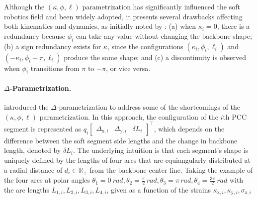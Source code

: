 Although the $(\kappa,\phi,\ell)$ parametrization has significantly influenced the soft robotics field and been widely adopted, it presents several drawbacks affecting both kinematics and dynamics, as initially noted by \citet{della2020improved}: (a) when $\kappa_i = 0$, there is a redundancy because $\phi_i$ can take any value without changing the backbone shape; (b) a sign redundancy exists for $\kappa$, since the configurations $(\kappa_i, \phi_i, \ell_i)$ and $(-\kappa_i, \phi_i-\pi, \ell_i)$ produce the same shape; and (c) a discontinuity is observed when $\phi_i$ transitions from $\pi$ to $-\pi$, or vice versa.

\paragraph{$\Delta$-Parametrization.}
\citet{della2020improved} introduced the $\Delta$-parametrization to address some of the shortcomings of the $(\kappa,\phi,\ell)$ parametrization. In this approach, the configuration of the $i$th \gls{PCC} segment is represented as 
$q_i \begin{bmatrix}
    \Delta_{\mathrm{x},i} & \Delta_{\mathrm{y},i} & \delta L_i
\end{bmatrix}^\top$,
which depends on the difference between the soft segment side lengths and the change in backbone length, denoted by $\delta L_i$. The underlying intuition is that each segment’s shape is uniquely defined by the lengths of four arcs that are equiangularly distributed at a radial distance of $d_i \in \mathbb{R}_+$ from the backbone center line.
Taking the example of the four arcs at polar angles $\theta_1 = \SI{0}{rad}, \theta_2 = \frac{\pi}{2} \, \si{rad}, \theta_3 = \pi \, \si{rad}, \theta_4 = \frac{3\pi}{2} \, \si{rad}$ with the arc lengths $L_{1,i}, L_{2,i}, L_{3,i}, L_{4,i}$, given as a function of the strains $\kappa_{\mathrm{x},i}, \kappa_{\mathrm{y},i}, \sigma_{\mathrm{z},i}$ 
